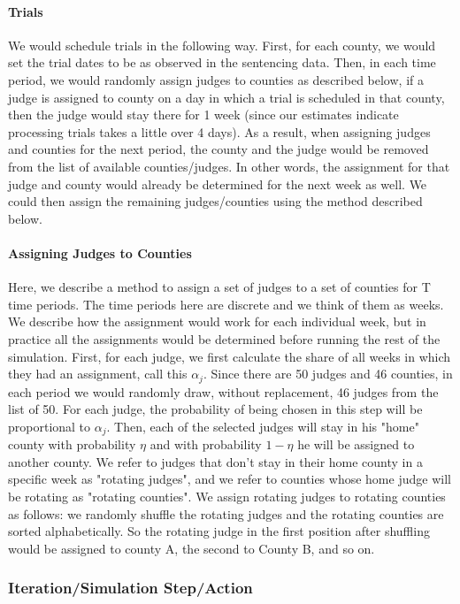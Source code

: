 \documentclass[11pt, oneside]{article}   	%
\theoremstyle{ModifiedStyle}
\begin{document}
		  \paragraph{Trials} We would schedule trials in the following way. First, for each county, we would set the trial dates to be as observed in the sentencing data. Then, in each time period, we would randomly assign judges to counties as described below, if a judge is assigned to county on a day in which a trial is scheduled in that county, then the judge would stay there for 1 week (since our estimates indicate processing trials takes a little over 4 days). As a result, when assigning judges and counties for the next period, the county and the judge would be removed from the list of available counties/judges. In other words, the assignment for that judge and county would already be determined for the next week as well. We could then assign the remaining judges/counties using the method described below.

		  \paragraph{Assigning Judges to Counties} Here, we describe a method to assign a set of judges to a set of counties for T time periods. The time periods here are discrete and we think of them as weeks. We describe how the assignment would work for each individual week, but in practice all the assignments would be determined before running the rest of the simulation.
			First, for each judge, we first calculate the share of all weeks in which they had an assignment, call this $\alpha_j$. Since there are 50 judges and 46 counties, in each period we would randomly draw, without replacement, 46 judges from the list of 50. For each judge, the probability of being chosen in this step will be proportional to $\alpha_j$. Then, each of the selected judges will stay in his "home" county with probability $\eta$ and with probability $1-\eta$ he will be assigned to another county. We refer to judges that don't stay in their home county in a specific week as "rotating judges", and we refer to counties whose home judge will be rotating as "rotating counties". We assign rotating judges to rotating counties as follows: we randomly shuffle the rotating judges and the rotating counties are sorted alphabetically. So the rotating judge in the first position after shuffling would be assigned to county A, the second to County B, and so on.

		\subsubsection{Iteration/Simulation Step/Action}
\end{document}
